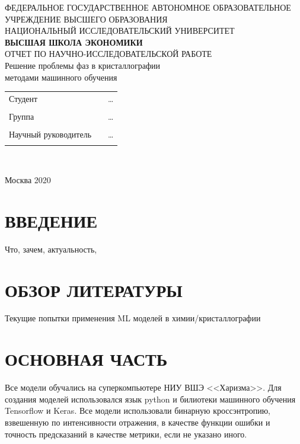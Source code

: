 \documentclass{article}
\begin{document}
\begin{center}

\small{ФЕДЕРАЛЬНОЕ ГОСУДАРСТВЕННОЕ АВТОНОМНОЕ ОБРАЗОВАТЕЛЬНОЕ УЧРЕЖДЕНИЕ ВЫСШЕГО ОБРАЗОВАНИЯ}\\
\footnotesize{НАЦИОНАЛЬНЫЙ ИССЛЕДОВАТЕЛЬСКИЙ УНИВЕРСИТЕТ}\\ 
\small{\textbf{ВЫСШАЯ ШКОЛА ЭКОНОМИКИ}}\\
\hfill \break
\hfill \break
\hfill \break
\hfill \break
\hfill \break
\hfill \break
\hfill \break
\hfill \break
\hfill \break
\large{ОТЧЕТ ПО НАУЧНО-ИССЛЕДОВАТЕЛЬСКОЙ РАБОТЕ}\\
Решение проблемы фаз в кристаллографии \\
методами машинного обучения
\end{center}
\hfill \break
\hfill \break
\hfill \break
\normalsize{
\begin{tabular}{lp{8cm}l}
Студент & & \ldots  \\\\
Группа & & \ldots \\\\
Научный руководитель  &  &\ldots\\\\
\end{tabular}
}\\
\hfill \break
\hfill \break
\hfill \break
\hfill \break
\hfill \break
\hfill \break
\begin{center} Москва 2020 \end{center}
\thispagestyle{empty}
\newpage
\tableofcontents
\newpage


\section{ВВЕДЕНИЕ}
Что, зачем, актуальность, 

\section{ОБЗОР ЛИТЕРАТУРЫ}
Текущие попытки применения ML моделей в химии/кристаллографии

\section{ОСНОВНАЯ ЧАСТЬ}
Все модели обучались на суперкомпьютере НИУ ВШЭ <<Харизма>>. Для создания моделей использовался язык python и билиотеки машинного обучения Tensorflow и Keras. Все модели использовали бинарную кроссэнтропию, взвешенную по интенсивности отражения, в качестве функции ошибки и точность предсказаний в качестве метрики, если не указано иного.
  
\end{document}
